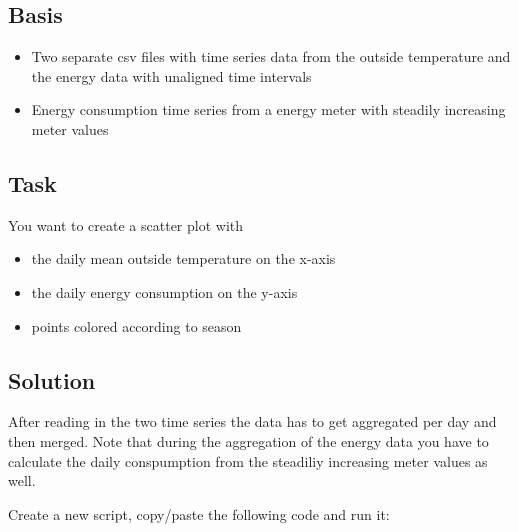 \documentclass[
]{book}
\begin{document}
\hypertarget{basis}{%
\subsection{Basis}\label{basis}}

\begin{itemize}
\item
  Two separate csv files with time series data from the outside temperature and the energy data with unaligned time intervals
\item
  Energy consumption time series from a energy meter with steadily increasing meter values
\end{itemize}

\hypertarget{task}{%
\subsection{Task}\label{task}}

You want to create a scatter plot with

\begin{itemize}
\item
  the daily mean outside temperature on the x-axis
\item
  the daily energy consumption on the y-axis
\item
  points colored according to season
\end{itemize}

\hypertarget{solution}{%
\subsection{Solution}\label{solution}}

After reading in the two time series the data has to get aggregated per day and then merged. Note that during the aggregation of the energy data you have to calculate the daily conspumption from the steadiliy increasing meter values as well.

Create a new script, copy/paste the following code and run it:
\end{document}
